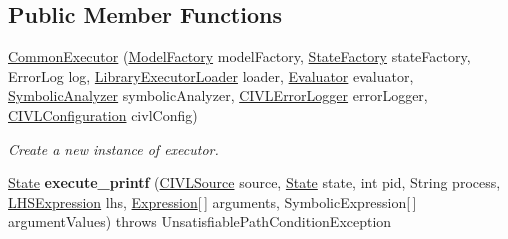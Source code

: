 \subsection*{Public Member Functions}
\begin{DoxyCompactItemize}
\item 
\hyperlink{classedu_1_1udel_1_1cis_1_1vsl_1_1civl_1_1semantics_1_1common_1_1CommonExecutor_a34966eeb8c5174397f7c93686c7a4aaf}{Common\+Executor} (\hyperlink{interfaceedu_1_1udel_1_1cis_1_1vsl_1_1civl_1_1model_1_1IF_1_1ModelFactory}{Model\+Factory} model\+Factory, \hyperlink{interfaceedu_1_1udel_1_1cis_1_1vsl_1_1civl_1_1state_1_1IF_1_1StateFactory}{State\+Factory} state\+Factory, Error\+Log log, \hyperlink{interfaceedu_1_1udel_1_1cis_1_1vsl_1_1civl_1_1semantics_1_1IF_1_1LibraryExecutorLoader}{Library\+Executor\+Loader} loader, \hyperlink{interfaceedu_1_1udel_1_1cis_1_1vsl_1_1civl_1_1semantics_1_1IF_1_1Evaluator}{Evaluator} evaluator, \hyperlink{interfaceedu_1_1udel_1_1cis_1_1vsl_1_1civl_1_1semantics_1_1IF_1_1SymbolicAnalyzer}{Symbolic\+Analyzer} symbolic\+Analyzer, \hyperlink{classedu_1_1udel_1_1cis_1_1vsl_1_1civl_1_1log_1_1IF_1_1CIVLErrorLogger}{C\+I\+V\+L\+Error\+Logger} error\+Logger, \hyperlink{classedu_1_1udel_1_1cis_1_1vsl_1_1civl_1_1config_1_1IF_1_1CIVLConfiguration}{C\+I\+V\+L\+Configuration} civl\+Config)
\begin{DoxyCompactList}\small\item\em Create a new instance of executor. \end{DoxyCompactList}\item 
\hypertarget{classedu_1_1udel_1_1cis_1_1vsl_1_1civl_1_1semantics_1_1common_1_1CommonExecutor_a5f3da25e14c5ba4da5a20c26749a69d3}{}\hyperlink{interfaceedu_1_1udel_1_1cis_1_1vsl_1_1civl_1_1state_1_1IF_1_1State}{State} {\bfseries execute\+\_\+printf} (\hyperlink{interfaceedu_1_1udel_1_1cis_1_1vsl_1_1civl_1_1model_1_1IF_1_1CIVLSource}{C\+I\+V\+L\+Source} source, \hyperlink{interfaceedu_1_1udel_1_1cis_1_1vsl_1_1civl_1_1state_1_1IF_1_1State}{State} state, int pid, String process, \hyperlink{interfaceedu_1_1udel_1_1cis_1_1vsl_1_1civl_1_1model_1_1IF_1_1expression_1_1LHSExpression}{L\+H\+S\+Expression} lhs, \hyperlink{interfaceedu_1_1udel_1_1cis_1_1vsl_1_1civl_1_1model_1_1IF_1_1expression_1_1Expression}{Expression}\mbox{[}$\,$\mbox{]} arguments, Symbolic\+Expression\mbox{[}$\,$\mbox{]} argument\+Values)  throws Unsatisfiable\+Path\+Condition\+Exception \label{classedu_1_1udel_1_1cis_1_1vsl_1_1civl_1_1semantics_1_1common_1_1CommonExecutor_a5f3da25e14c5ba4da5a20c26749a69d3}


\end{DoxyCompactItemize}
